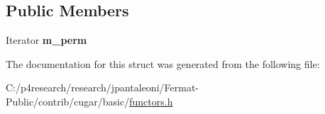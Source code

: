 \subsection*{Public Members}
\begin{DoxyCompactItemize}
\item 
\mbox{\label{structcugar_1_1gather__functor_a440b179f2ea8d1dfd007fb8f9f4894ac}} 
Iterator {\bfseries m\+\_\+perm}
\end{DoxyCompactItemize}


The documentation for this struct was generated from the following file\+:\begin{DoxyCompactItemize}
\item 
C\+:/p4research/research/jpantaleoni/\+Fermat-\/\+Public/contrib/cugar/basic/\hyperlink{functors_8h}{functors.\+h}\end{DoxyCompactItemize}
